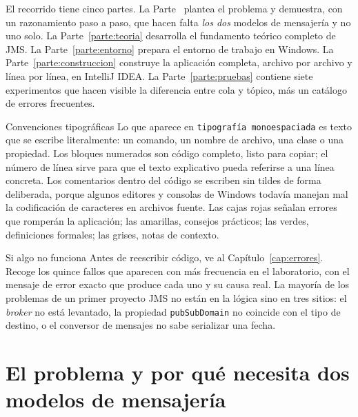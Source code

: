 \documentclass[11pt,a4paper]{book}
\begin{document}
El recorrido tiene cinco partes.
La Parte~\ref{parte:problema} plantea el problema y demuestra, con un razonamiento paso a paso, que hacen falta \emph{los dos} modelos de mensajería y no uno solo.
La Parte~\ref{parte:teoria} desarrolla el fundamento teórico completo de JMS.
La Parte~\ref{parte:entorno} prepara el entorno de trabajo en Windows.
La Parte~\ref{parte:construccion} construye la aplicación completa, archivo por archivo y línea por línea, en IntelliJ IDEA.
La Parte~\ref{parte:pruebas} contiene siete experimentos que hacen visible la diferencia entre cola y tópico, más un catálogo de errores frecuentes.

\begin{cajaNota}{Convenciones tipográficas}
	Lo que aparece en \texttt{tipografía monoespaciada} es texto que se escribe literalmente: un comando, un nombre de archivo, una clase o una propiedad.
	Los bloques numerados son código completo, listo para copiar; el número de línea sirve para que el texto explicativo pueda referirse a una línea concreta.
	Los comentarios dentro del código se escriben sin tildes de forma deliberada, porque algunos editores y consolas de Windows todavía manejan mal la codificación de caracteres en archivos fuente.
	Las cajas rojas señalan errores que romperán la aplicación; las amarillas, consejos prácticos; las verdes, definiciones formales; las grises, notas de contexto.
\end{cajaNota}

\begin{cajaTip}{Si algo no funciona}
	Antes de reescribir código, ve al Capítulo~\ref{cap:errores}.
	Recoge los quince fallos que aparecen con más frecuencia en el laboratorio, con el mensaje de error exacto que produce cada uno y su causa real.
	La mayoría de los problemas de un primer proyecto JMS no están en la lógica sino en tres sitios: el \emph{broker} no está levantado, la propiedad \texttt{pubSubDomain} no coincide con el tipo de destino, o el conversor de mensajes no sabe serializar una fecha.
\end{cajaTip}

\mainmatter

\part{El problema y por qué necesita dos modelos de mensajería}
\label{parte:problema}
\end{document}
